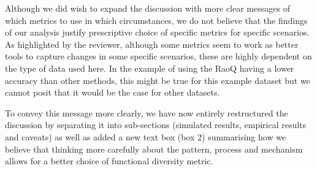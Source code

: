 \documentclass[
]{article}
\begin{document}
Although we did wish to expand the discussion with more clear messages of which metrics to use in which circumstances, we do not believe that the findings of our analysis justify prescriptive choice of specific metrics for specific scenarios.
As highlighted by the reviewer, although some metrics seem to work as better tools to capture changes in some specific scenarios, these are highly dependent on the type of data used here.
In the example of using the RaoQ having a lower accuracy than other methods, this might be true for this example dataset but we cannot posit that it would be the case for other datasets.

To convey this message more clearly, we have now entirely restructured the discussion by separating it into sub-sections (simulated results, empirical results and caveats) as well as added a new text box (box 2) summarising how we believe that thinking more carefully about the pattern, process and mechanism allows for a better choice of functional diversity metric.
\end{document}
